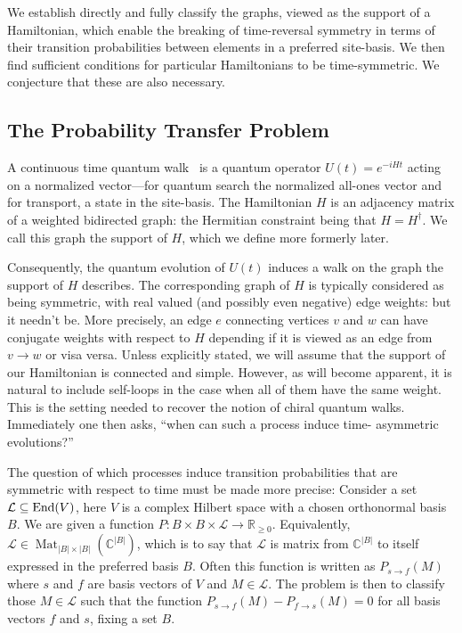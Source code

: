 \documentclass[twocolumn,superscriptaddress]{revtex4-1}
\newcommand{\C}{\mathbb{C}}
\newcommand{\Mat}{\operatorname{Mat}}
\newcommand{\End}{\textnormal{End}}
\theoremstyle{plain}
\theoremstyle{definition}
\theoremstyle{definition}
\theoremstyle{definition}
\theoremstyle{definition}
\theoremstyle{definition}
\theoremstyle{definition}
\begin{document}
We establish directly and fully classify the graphs, viewed as the support of a Hamiltonian, which enable the breaking of time-reversal 
symmetry in terms of their transition probabilities between elements in a preferred site-basis.  
We then find sufficient conditions for particular Hamiltonians to be time-symmetric. We conjecture that these are also necessary.


\subsection{The Probability Transfer Problem}

A continuous time quantum walk~\cite{mulken2011ctqw,PhysRevX.3.041007,childs2009universal,Perseguers2010} is a quantum operator $U(t)=e^{-iHt}$ acting on a normalized vector---for quantum search the normalized all-ones vector and for transport, a state in the site-basis. The Hamiltonian $H$ is an adjacency matrix of a weighted bidirected graph: the Hermitian constraint being that $H=H^\dagger$. We call this graph the support of $H$, which we define more formerly later.

Consequently, the quantum evolution of $U(t)$ induces a walk on the graph the support of $H$ describes. The corresponding graph of $H$ is typically considered as being symmetric, with real valued (and possibly even negative) edge weights: but it needn't be.  More precisely, an edge $e$ connecting vertices $v$ and $w$ can have conjugate weights with respect to $H$ depending if it is viewed as an edge from $v\to w$ or visa versa. Unless explicitly stated, we will assume that the support of our Hamiltonian is connected and simple. However, as will become apparent, it is natural to include self-loops in the case when all of them have the same weight.  This is the setting needed to recover the notion of chiral quantum walks.  Immediately one then asks, ``when can such a process induce time-
asymmetric evolutions?''  

The question of which processes induce transition probabilities that are symmetric with respect to time must be made more precise: Consider a set $\mathcal{L}\subseteq\End(V)$, here $V$ is a complex Hilbert space with a chosen orthonormal basis $B$. We are given a function $P:B\times B\times\mathcal{L}\to\mathbb{R}_{\ge0}$. Equivalently, $\mathcal{L}\in\Mat_{|B|\times|B|}(\C^{|B|})$, which is to say that $\mathcal{L}$ is matrix from $\C^{|B|}$ to itself expressed in the preferred basis $B$.  Often this function is written as $P_{s\to f}(M)$ where $s$ and $f$ are basis vectors of $V$ and $M\in\mathcal{L}$. The problem is then to classify those $M\in\mathcal{L}$ such that the function $P_{s\to f}(M)-P_{f\to s}(M)=0$ for all basis vectors $f$ and $s$, fixing a set $B$.
\end{document}
